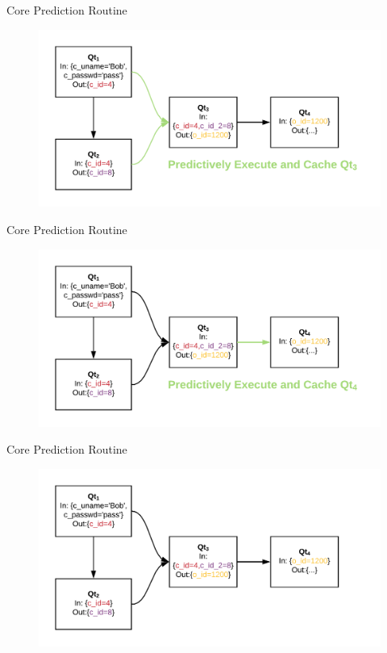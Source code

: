 \documentclass[10pt]{beamer}
\begin{document}
\begin{frame}[fragile]{Core Prediction Routine}
    \begin{figure}
        \hspace*{-1cm}
        \includegraphics[scale=0.22]{apollo_cpr_4}
    \end{figure}
\end{frame}

\begin{frame}[fragile]{Core Prediction Routine}
    \begin{figure}
        \hspace*{-1cm}
        \includegraphics[scale=0.22]{apollo_cpr_5}
    \end{figure}
\end{frame}

\begin{frame}[fragile]{Core Prediction Routine}
    \begin{figure}
        \hspace*{-1cm}
        \includegraphics[scale=0.22]{apollo_cpr}
    \end{figure}
\end{frame}
\end{document}
